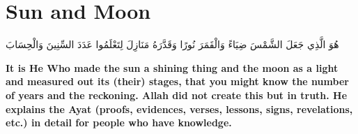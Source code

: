 \chapter{Sun and Moon}
\begin{center}
    {\Huge    
        \begin{Arabic}
            هُوَ الَّذِي جَعَلَ الشَّمْسَ ضِيَاءً وَالْقَمَرَ نُورًا وَقَدَّرَهُ مَنَازِلَ لِتَعْلَمُوا عَدَدَ السِّنِينَ وَالْحِسَابَ
        \end{Arabic}
    }    
\end{center}
\vspace*{\fill}
\vspace{3cm}
\begin{center}
    \Large \textbf{It is He Who made the sun a shining thing and the moon as a light and measured out its (their) stages, that you might know the number of years and the reckoning. Allah did not create this but in truth. He explains the Ayat (proofs, evidences, verses, lessons, signs, revelations, etc.) in detail for people who have knowledge.}
\end{center}
